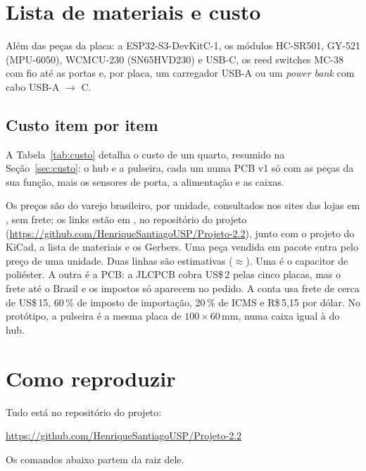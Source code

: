\section{Lista de materiais e custo}\label{ap:bom}
\begin{table}[H]
\centering
\caption{Lista de materiais da PCB v1 (gerada do KiCad).}
\label{tab:bom}
\footnotesize

\end{table}

Além das peças da placa: a ESP32-S3-DevKitC-1, os módulos HC-SR501, GY-521 (MPU-6050),
WCMCU-230 (SN65HVD230) e USB-C, os reed switches MC-38 com fio até as portas e, por placa, um
carregador USB-A ou um \textit{power bank} com cabo USB-A $\to$ C.

\subsection*{Custo item por item}

A Tabela~\ref{tab:custo} detalha o custo de um quarto, resumido na Seção~\ref{sec:custo}: o hub
e a pulseira, cada um numa PCB v1 só com as peças da sua função, mais os sensores de porta, a
alimentação e as caixas.

Os preços são do varejo brasileiro, por unidade, consultados nos sites das lojas em
\custoData{}, sem frete; os links estão em , no
repositório do projeto (\url{https://github.com/HenriqueSantiagoUSP/Projeto-2.2}), junto com o
projeto do KiCad, a lista de materiais e os Gerbers. Uma
peça vendida em pacote entra pelo preço de uma unidade. Duas linhas são estimativas
($\approx$). Uma é o capacitor de poliéster. A outra é a PCB: a JLCPCB cobra US\$\,2 pelas cinco
placas, mas o frete até o Brasil e os impostos só aparecem no pedido. A conta usa frete de cerca
de US\$\,15, 60\,\% de imposto de importação, 20\,\% de ICMS e R\$\,5,15 por dólar. No
protótipo, a pulseira é a mesma placa de $100 \times 60$\,mm, numa caixa igual à do hub.

\begin{table}[H]
\centering
\caption{Custo estimado do kit de um quarto (hub e pulseira), em reais.}
\label{tab:custo}
\footnotesize

\end{table}

\section{Como reproduzir}\label{ap:reproducao}
Tudo está no repositório do projeto:
\begin{center}
\url{https://github.com/HenriqueSantiagoUSP/Projeto-2.2}
\end{center}
Os comandos abaixo partem da raiz dele.

